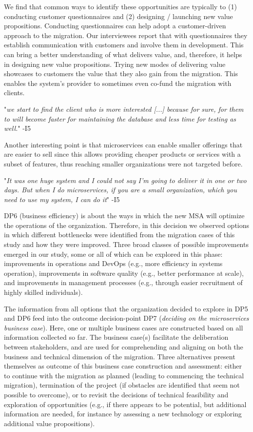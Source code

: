 \documentclass[sigconf,dvipsnames]{acmart}
\newcommand{\interviewquote}[2]{
 \def\FrameCommand{%
    \hspace{0pt}%
    {\color{MidnightBlue}\vrule width 1.5pt}%
    {\color{white}\vrule width 4pt}%
    \colorbox{white}
  }%
  \MakeFramed{\advance\hsize-\width\FrameRestore}%
  \noindent\hspace{-4.55pt}%
  \footnotesize{"\emph{#1}" -{#2}}\vspace{0.5pt}\endMakeFramed%
}
\begin{document}
We find that common ways to identify these opportunities are typically to (1) conducting customer questionnaires and (2) designing / launching new value propositions. 
Conducting questionnaires can help adopt a customer-driven approach to the migration.
Our interviewees report that with questionnaires they establish communication with customers and involve them in development.
This can bring a better understanding of what delivers value, and, therefore, it helps in designing new value propositions.
Trying new modes of delivering value showcases to customers the value that they also gain from the migration. 
This enables the system's provider to sometimes even co-fund the migration with clients.
    \interviewquote{we start to find the client who is more interested [...] because for sure, for them to will become faster for maintaining the database and less time for testing as well.}{I5}

Another interesting point is that microservices can enable smaller offerings that are easier to sell since this allows providing cheaper products or services with a subset of features, thus reaching smaller organizations were not targeted before.
    \interviewquote{It was one huge system and I could not say I'm going to deliver it in one or two days. But when I do microservices, if you are a small organization, which you need to use my system, I can do it}{I5}


DP6 (business efficiency) is about the ways in which the new MSA will optimize the operations of the organization. 
Therefore, in this decision we observed options in which different bottlenecks were identified from the migration cases of this study and how they were improved. 
Three broad classes of possible improvements emerged in our study, some or all of which can be explored in this phase: improvements in operations and DevOps (e.g., more efficiency in systems operation), improvements in software quality (e.g., better performance at scale), and improvements in management processes (e.g., through easier recruitment of highly skilled individuals).


The information from all options that the organization decided to explore in DP5 and DP6 feed into the outcome decision-point DP7 (\emph{deciding on the microservices business case}). Here, one or multiple business cases are constructed based on all information collected so far. The business case(s) facilitate the deliberation between stakeholders, and are used for comprehending and aligning on both the business and technical dimension of the migration. 
Three alternatives present themselves as outcome of this business case construction and assessment: either to continue with the migration as planned (leading to commencing the technical migration), termination of the project (if obstacles are identified that seem not possible to overcome), or to revisit the decisions of technical feasibility and exploration of opportunities (e.g., if there appears to be potential, but additional information are needed, for instance by assessing a new technology or exploring additional value propositions).
\end{document}

